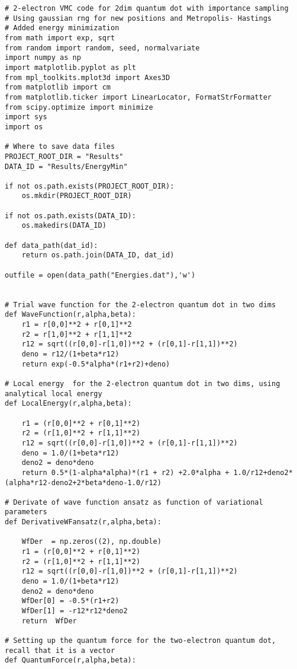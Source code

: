 \documentclass[%
oneside,                 %
final,                   %
10pt]{article}
\begin{document}
\begin{verbatim}
# 2-electron VMC code for 2dim quantum dot with importance sampling
# Using gaussian rng for new positions and Metropolis- Hastings 
# Added energy minimization
from math import exp, sqrt
from random import random, seed, normalvariate
import numpy as np
import matplotlib.pyplot as plt
from mpl_toolkits.mplot3d import Axes3D
from matplotlib import cm
from matplotlib.ticker import LinearLocator, FormatStrFormatter
from scipy.optimize import minimize
import sys
import os

# Where to save data files
PROJECT_ROOT_DIR = "Results"
DATA_ID = "Results/EnergyMin"

if not os.path.exists(PROJECT_ROOT_DIR):
    os.mkdir(PROJECT_ROOT_DIR)

if not os.path.exists(DATA_ID):
    os.makedirs(DATA_ID)

def data_path(dat_id):
    return os.path.join(DATA_ID, dat_id)

outfile = open(data_path("Energies.dat"),'w')


# Trial wave function for the 2-electron quantum dot in two dims
def WaveFunction(r,alpha,beta):
    r1 = r[0,0]**2 + r[0,1]**2
    r2 = r[1,0]**2 + r[1,1]**2
    r12 = sqrt((r[0,0]-r[1,0])**2 + (r[0,1]-r[1,1])**2)
    deno = r12/(1+beta*r12)
    return exp(-0.5*alpha*(r1+r2)+deno)

# Local energy  for the 2-electron quantum dot in two dims, using analytical local energy
def LocalEnergy(r,alpha,beta):
    
    r1 = (r[0,0]**2 + r[0,1]**2)
    r2 = (r[1,0]**2 + r[1,1]**2)
    r12 = sqrt((r[0,0]-r[1,0])**2 + (r[0,1]-r[1,1])**2)
    deno = 1.0/(1+beta*r12)
    deno2 = deno*deno
    return 0.5*(1-alpha*alpha)*(r1 + r2) +2.0*alpha + 1.0/r12+deno2*(alpha*r12-deno2+2*beta*deno-1.0/r12)

# Derivate of wave function ansatz as function of variational parameters
def DerivativeWFansatz(r,alpha,beta):
    
    WfDer  = np.zeros((2), np.double)
    r1 = (r[0,0]**2 + r[0,1]**2)
    r2 = (r[1,0]**2 + r[1,1]**2)
    r12 = sqrt((r[0,0]-r[1,0])**2 + (r[0,1]-r[1,1])**2)
    deno = 1.0/(1+beta*r12)
    deno2 = deno*deno
    WfDer[0] = -0.5*(r1+r2)
    WfDer[1] = -r12*r12*deno2
    return  WfDer

# Setting up the quantum force for the two-electron quantum dot, recall that it is a vector
def QuantumForce(r,alpha,beta):


\end{verbatim}
\end{document}
